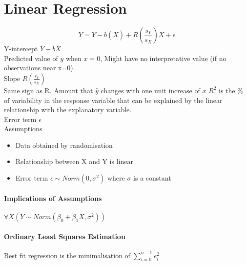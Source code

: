 \section{Linear Regression}
\[Y=\overline{Y}-b(\overline{X})+R(\frac{s_Y}{s_X})X+\epsilon\]
\textcolor{OliveGreen}{Y-intercept} $\overline{Y}-b\overline{X}$\\
Predicted value of $y$ when $x=0$, Might have no interpretative value (if no
observations near x=0).\\
\textcolor{OliveGreen}{Slope} $R(\frac{s_Y}{s_X})$\\
Same sign as R. Amount that $\hat{y}$ changes with one unit increase of $x$
$R^2$ is the \% of variability in the response variable that can be explained by
the linear relationship with the explanatory variable.\\
\textcolor{OliveGreen}{Error term} $\epsilon$\\
\textcolor{Bittersweet}{Assumptions}
\begin{itemize}
	\item Data obtained by randomisation
	\item Relationship between X and Y is linear
	\item Error term $\epsilon\sim Norm(0,\sigma^2)$ where $\sigma$ is a constant
\end{itemize}
\paragraph{Implications of Assumptions}
$\forall X(Y\sim Norm(\beta_0+\beta_1X,\sigma^2))$\\
\paragraph{Ordinary Least Squares Estimation}
Best fit regression is the minimalisation of $\sum_{i=0}^{n-1}e_i^2$\\
